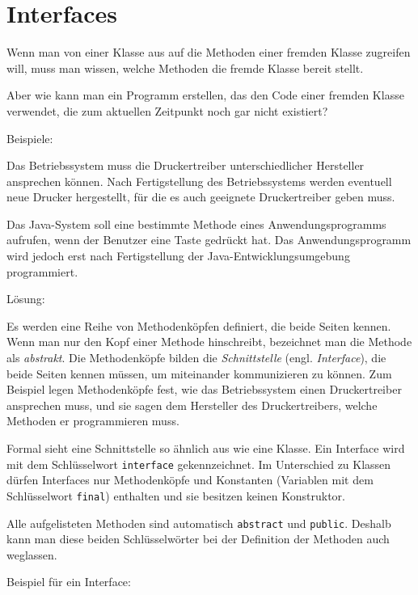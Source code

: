 \section{Interfaces}

Wenn man von einer Klasse aus auf die Methoden einer fremden Klasse zugreifen
will, muss man wissen, welche Methoden die fremde Klasse bereit stellt.

Aber wie kann man ein Programm erstellen, das den Code einer fremden Klasse
verwendet, die zum aktuellen Zeitpunkt noch gar nicht existiert?

Beispiele:

\begin{compactitem}
\item Das Betriebssystem muss die Druckertreiber unterschiedlicher Hersteller
ansprechen können. Nach Fertigstellung des Betriebssystems werden eventuell
neue Drucker hergestellt, für die es auch geeignete Druckertreiber geben muss.

\item Das Java-System soll eine bestimmte Methode eines Anwendungsprogramms
aufrufen, wenn der Benutzer eine Taste gedrückt hat. Das Anwendungsprogramm wird
jedoch erst nach Fertigstellung der Java-Entwicklungsumgebung programmiert.
\end{compactitem}

Lösung:

Es werden eine Reihe von Methodenköpfen definiert, die beide Seiten kennen.
Wenn man nur den Kopf einer Methode hinschreibt, bezeichnet man die Methode als
\emph{abstrakt}. Die Methodenköpfe bilden die \emph{Schnittstelle} (engl.
\emph{Interface}), die beide Seiten kennen müssen, um miteinander kommunizieren
zu können. Zum Beispiel legen Methodenköpfe fest, wie das Betriebssystem einen
Druckertreiber ansprechen muss, und sie sagen dem Hersteller des
Druckertreibers, welche Methoden er programmieren muss.

Formal sieht eine Schnittstelle so ähnlich aus wie eine Klasse. Ein Interface
wird mit dem Schlüsselwort \lstinline|interface| gekennzeichnet. Im Unterschied
zu Klassen dürfen Interfaces nur Methodenköpfe und Konstanten (Variablen mit
dem Schlüsselwort \lstinline|final|) enthalten und sie besitzen keinen
Konstruktor.

Alle aufgelisteten Methoden sind automatisch \lstinline|abstract| und
\lstinline|public|. Deshalb kann man diese beiden Schlüsselwörter bei der
Definition der Methoden auch weglassen.

Beispiel für ein Interface:

